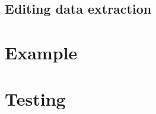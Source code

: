 \documentclass{article}
\begin{document}

\subsection{Editing data extraction}






\section{Example}


\section{Testing}
\end{document}

